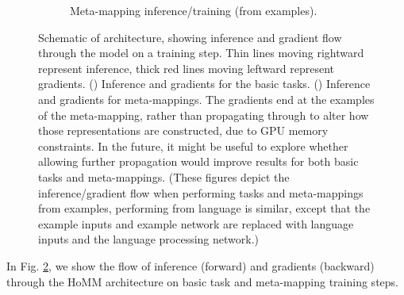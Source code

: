 \begin{figure}[h]
\begin{subfigure}{\textwidth}
{
}
\caption{Meta-mapping inference/training (from examples).}\label{supp_fig:HoMM:gradient_flow:meta_mappings}
\end{subfigure}
\caption[Schematic of architecture, showing inference and gradient flow through the model on a training step.]{Schematic of architecture, showing inference and gradient flow through the model on a training step. Thin lines moving rightward represent inference, thick red lines moving leftward represent gradients. () Inference and gradients for the basic tasks. () Inference and gradients for meta-mappings. The gradients end at the examples of the meta-mapping, rather than propagating through to alter how those representations are constructed, due to GPU memory constraints. In the future, it might be useful to explore whether allowing further propagation would improve results for both basic tasks and meta-mappings. (These figures depict the inference/gradient flow when performing tasks and meta-mappings from examples, performing from language is similar, except that the example inputs and example network are replaced with language inputs and the language processing network.)} \label{supp_fig:HoMM:gradient_flow}
\end{figure}

In Fig. \ref{supp_fig:HoMM:gradient_flow}, we show the flow of inference (forward) and gradients (backward) through the HoMM architecture on basic task and meta-mapping training steps.

